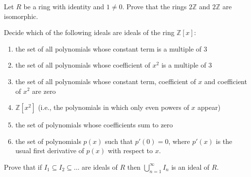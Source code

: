 \documentclass[12pt,letterpaper]{hmcpset}
\newcommand{\Zz}{\mathbb{Z}}
\begin{document}

\begin{problem}[7.3.1]
	Let $R$ be a ring with identity and $1 \ne 0$. Prove that the rings $2\Zz$ and $2\Zz$ are isomorphic.
\end{problem}

\begin{solution}
\vfill
\end{solution}
\newpage

\begin{problem}[7.3.10]
	Decide which of the following ideals are ideals of the ring $\Zz[x]$:
	\begin{enumerate}
	    \item
	        the set of all polynomials
	        whose constant term is a
	        multiple of $3$
	    \item
	        the set of all polynomials
	        whose coefficient of
	        $x^2$ is a multiple of $3$
	    \item
	        the set of all polynomials
	        whose constant term, coefficient
	        of $x$ and coefficient of $x^2$
	        are zero
	    \item
	        $\Zz[x^2]$ (i.e., the polynomials
	        in which only even powers of $x$
	        appear)
	    \item
	        the set of polynomials whose
	        coefficients sum to zero
	    \item
	        the set of polynomials $p(x)$
	        such that $p'(0) = 0$, where
	        $p'(x)$ is the usual
	        first derivative of $p(x)$
	        with respect to $x$.
	\end{enumerate}
\end{problem}

\begin{solution}
\vfill
\end{solution}
\newpage

\begin{problem}[7.3.19]
	Prove that if $I_1 \subseteq I_2 \subseteq \dots $ are ideals of $R$ then $\bigcup_{n=1}^\infty I_n$ is an ideal of $R$.
\end{problem}

\begin{solution}
\vfill
\end{solution}
\newpage
\end{document}
